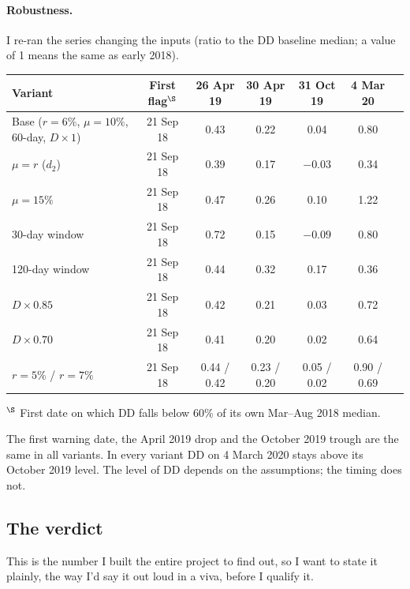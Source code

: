 \paragraph{Robustness.} I re-ran the series changing the inputs (ratio to the DD baseline median; a value of 1 means the same as early 2018).
\begin{center}\footnotesize
\begin{tabular}{@{}p{5.2cm}cccccc@{}}\toprule
\textbf{Variant} & \textbf{First flag$^\S$} & \textbf{26 Apr 19} & \textbf{30 Apr 19} & \textbf{31 Oct 19} & \textbf{4 Mar 20}\\\midrule
Base ($r=6\%$, $\mu=10\%$, 60-day, $D\times1$) & 21 Sep 18 & 0.43 & 0.22 & 0.04 & 0.80\\
$\mu=r$ ($d_2$) & 21 Sep 18 & 0.39 & 0.17 & $-0.03$ & 0.34\\
$\mu=15\%$ & 21 Sep 18 & 0.47 & 0.26 & 0.10 & 1.22\\
30-day window & 21 Sep 18 & 0.72 & 0.15 & $-0.09$ & 0.80\\
120-day window & 21 Sep 18 & 0.44 & 0.32 & 0.17 & 0.36\\
$D\times0.85$ & 21 Sep 18 & 0.42 & 0.21 & 0.03 & 0.72\\
$D\times0.70$ & 21 Sep 18 & 0.41 & 0.20 & 0.02 & 0.64\\
$r=5\%$ / $r=7\%$ & 21 Sep 18 & 0.44 / 0.42 & 0.23 / 0.20 & 0.05 / 0.02 & 0.90 / 0.69\\\bottomrule
\end{tabular}

{\footnotesize $^\S$ First date on which DD falls below 60\% of its own Mar--Aug 2018 median.}
\end{center}
The first warning date, the April 2019 drop and the October 2019 trough are the same in all variants. In every variant DD on 4 March 2020 stays above its October 2019 level. The level of DD depends on the assumptions; the timing does not.

\subsection{The verdict}
\label{sec:verdict}
This is the number I built the entire project to find out, so I want to state it plainly, the way I'd say it out loud in a viva, before I qualify it.

